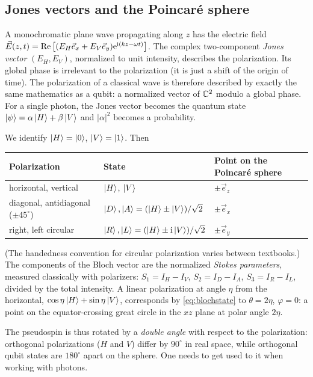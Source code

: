 \subsection{Jones vectors and the Poincaré sphere}
\begin{origin}
A monochromatic plane wave propagating along $z$ has the electric field
$\vec E(z,t)=\operatorname{Re}\left[(E_H\vec e_x+E_V\vec e_y)\mathrm e^{\mathrm i(kz-\omega t)}\right]$. The complex two-component \emph{Jones vector}
$(E_H,E_V)$, normalized to unit intensity, describes the polarization. Its global phase is irrelevant to the polarization (it is just a
shift of the origin of time). The polarization of a classical wave is therefore described by exactly the same mathematics as a qubit:
a normalized vector of $\mathbb C^2$ modulo a global phase. For a single photon, the Jones vector becomes the quantum state
$\left|\psi\right\rangle=\alpha\left|H\right\rangle+\beta\left|V\right\rangle$ and $|\alpha|^2$ becomes a probability.
\end{origin}
We identify $\left|H\right\rangle=\left|0\right\rangle$, $\left|V\right\rangle=\left|1\right\rangle$. Then
\begin{center}
\begin{tabular}{@{}lll@{}}\toprule
Polarization & State & Point on the Poincaré sphere\\ \midrule
horizontal, vertical & $\left|H\right\rangle$, $\left|V\right\rangle$ & $\pm\vec e_z$\\
diagonal, antidiagonal ($\pm45^\circ$) & $\left|D\right\rangle,\left|A\right\rangle=(\left|H\right\rangle\pm\left|V\right\rangle)/\sqrt2$ & $\pm\vec e_x$\\
right, left circular & $\left|R\right\rangle,\left|L\right\rangle=(\left|H\right\rangle\pm\mathrm i\left|V\right\rangle)/\sqrt2$ & $\pm\vec e_y$\\ \bottomrule
\end{tabular}
\end{center}
(The handedness convention for circular polarization varies between textbooks.) The components of the Bloch vector are the normalized
\emph{Stokes parameters}, measured classically with polarizers: $S_1=I_H-I_V$, $S_2=I_D-I_A$, $S_3=I_R-I_L$, divided by the total intensity.
A linear polarization at angle $\eta$ from the horizontal, $\cos\eta\left|H\right\rangle+\sin\eta\left|V\right\rangle$, corresponds by \cref{eq:blochstate} to
$\theta=2\eta$, $\varphi=0$: a point on the equator-crossing great circle in the $xz$ plane at polar angle $2\eta$.

The pseudospin is thus rotated by a \emph{double angle} with respect to the polarization: orthogonal polarizations ($H$ and $V$) differ by
$90^\circ$ in real space, while orthogonal qubit states are $180^\circ$ apart on the sphere. One needs to get used to it when working with photons.

